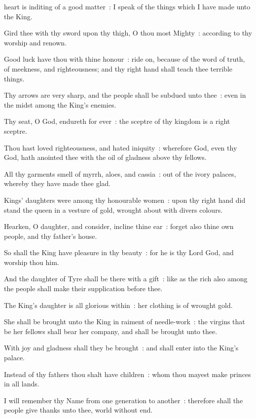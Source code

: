  heart is inditing of a good matter~: I speak of the things which I have made unto the King.\par
{}
Gird thee with thy sword upon thy thigh, O thou most Mighty~: according to thy worship and renown.\par
{}Good luck have thou with thine honour~: ride on, because of the word of truth, of meekness, and righteousness; and thy right hand shall teach thee terrible things.\par
{}Thy arrows are very sharp, and the people shall be subdued unto thee~: even in the midst among the King's enemies.\par
{}Thy seat, O God, endureth for ever~: the sceptre of thy kingdom is a right sceptre.\par
{}Thou hast loved righteousness, and hated iniquity~: wherefore God, even thy God, hath anointed thee with the oil of gladness above thy fellows.\par
{}All thy garments smell of myrrh, aloes, and cassia~: out of the ivory palaces, whereby they have made thee glad.\par
{}Kings' daughters were among thy honourable women~: upon thy right hand did stand the queen in a vesture of gold, wrought about with divers colours.\par
{}Hearken, O daughter, and consider, incline thine ear~: forget also thine own people, and thy father's house.\par
{}So shall the King have pleasure in thy beauty~: for he is thy Lord God, and worship thou him.\par
{}And the daughter of Tyre shall be there with a gift~: like as the rich also among the people shall make their supplication before thee.\par
{}The King's daughter is all glorious within~: her clothing is of wrought gold.\par
{}She shall be brought unto the King in raiment of needle-work~: the virgins that be her fellows shall bear her company, and shall be brought unto thee.\par
{}With joy and gladness shall they be brought~: and shall enter into the King's palace.\par
{}Instead of thy fathers thou shalt have children~: whom thou mayest make princes in all lands.\par
{}I will remember thy Name from one generation to another~: therefore shall the people give thanks unto thee, world without end.\par

